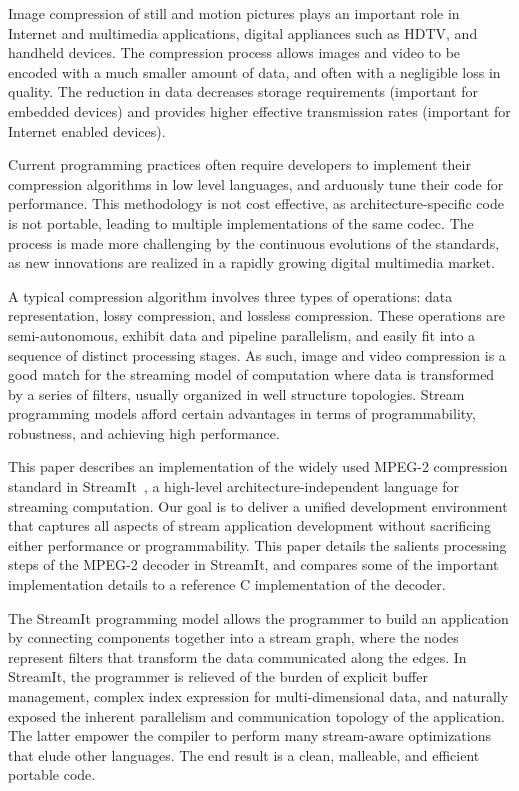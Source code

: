 
Image compression of still and motion pictures plays an important role
in Internet and multimedia applications, digital appliances such as
HDTV, and handheld devices. The compression process allows images and
video to be encoded with a much smaller amount of data, and often with
a negligible loss in quality. The reduction in data decreases storage
requirements (important for embedded devices) and provides higher
effective transmission rates (important for Internet enabled devices).

Current programming practices often require developers to implement
their compression algorithms in low level languages, and arduously
tune their code for performance. This methodology is not cost
effective, as architecture-specific code is not portable, leading to
multiple implementations of the same codec. The process is made more
challenging by the continuous evolutions of the standards, as new
innovations are realized in a rapidly growing digital multimedia
market.

A typical compression algorithm involves three types of operations:
data representation, lossy compression, and lossless
compression. These operations are semi-autonomous, exhibit data and
pipeline parallelism, and easily fit into a sequence of distinct
processing stages. As such, image and video compression is a good
match for the streaming model of computation where data is transformed
by a series of filters, usually organized in well structure
topologies.  Stream programming models afford certain advantages in
terms of programmability, robustness, and achieving high performance.

This paper describes an implementation of the widely used MPEG-2
compression standard in StreamIt~\cite{streamitcc}, a high-level
architecture-independent language for streaming computation. Our goal
is to deliver a unified development environment that captures all
aspects of stream application development without sacrificing either
performance or programmability. This paper details the salients
processing steps of the MPEG-2 decoder in StreamIt, and compares some
of the important implementation details to a reference C
implementation of the decoder.

The StreamIt programming model allows the programmer to build an
application by connecting components together into a stream graph,
where the nodes represent filters that transform the data communicated
along the edges. In StreamIt, the programmer is relieved of the burden
of explicit buffer management, complex index expression for
multi-dimensional data, and naturally exposed the inherent
parallelism and communication topology of the application. The latter
empower the compiler to perform many stream-aware
optimizations~\cite{agrawal05cases,gordon02asplos,lamb03pldi,sermulins05lctes}
that elude other languages. The end result is a clean, malleable,
and efficient portable code.



